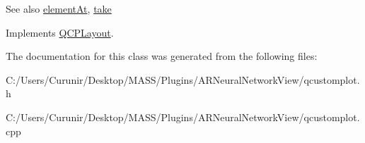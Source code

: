 \begin{DoxySeeAlso}{See also}
\hyperlink{class_q_c_p_layout_inset_a881ca205605bae9c034733b808f93a02}{element\+At}, \hyperlink{class_q_c_p_layout_inset_af7f13cc369f8190b5e7e17d5f39dfe1c}{take} 
\end{DoxySeeAlso}


Implements \hyperlink{class_q_c_p_layout_a5a79621fa0a6eabb8b520cfc04fb601a}{Q\+C\+P\+Layout}.



The documentation for this class was generated from the following files\+:\begin{DoxyCompactItemize}
\item 
C\+:/\+Users/\+Curunir/\+Desktop/\+M\+A\+S\+S/\+Plugins/\+A\+R\+Neural\+Network\+View/qcustomplot.\+h\item 
C\+:/\+Users/\+Curunir/\+Desktop/\+M\+A\+S\+S/\+Plugins/\+A\+R\+Neural\+Network\+View/qcustomplot.\+cpp\end{DoxyCompactItemize}
